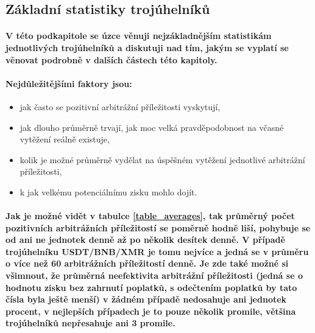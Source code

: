 \documentclass[thesis=B,czech]{FITthesis}[2019/03/21]
\begin{document}
\subsection{Základní statistiky trojúhelníků}
\paragraph{
V této podkapitole se úzce věnuji nejzákladnějším statistikám jednotlivých trojúhelníků a diskutuji nad tím, jakým se vyplatí se věnovat podrobně v dalších částech této kapitoly.
}
\paragraph{
Nejdůležitějšími faktory jsou: 
}
\begin{itemize}
    \item jak často se pozitivní arbitrážní příležitosti vyskytují,
    \item jak dlouho průměrně trvají, jak moc velká pravděpodobnost na včasné vytěžení reálně existuje,
    \item kolik je možné průměrně vydělat na úspěšném vytěžení jednotlivé arbitrážní příležitosti,
    \item k jak velkému potenciálnímu zisku mohlo dojít.
\end{itemize}
\paragraph{
Jak je možné vidět v tabulce \ref{table_averages}, tak průměrný počet pozitivních arbitrážních příležitostí se poměrně hodně liší, pohybuje se od ani ne jednotek denně až po několik desítek denně. V případě trojúhelníku USDT/BNB/XMR je tomu nejvíce a jedná se v průměru o více než 60 arbitrážních příležitostí denně. Je zde také možné si všimnout, že průměrná neefektivita arbitrážní příležitosti (jedná se o hodnotu zisku bez zahrnutí poplatků, s odečtením poplatků by tato čísla byla ještě menší) v žádném případě nedosahuje ani jednotek procent, v nejlepších případech je to pouze několik promile, většina trojúhelníků nepřesahuje ani 3 promile.
}
\end{document}
